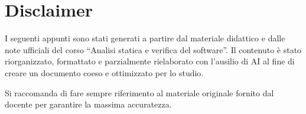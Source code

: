 \documentclass{article}
\begin{document}
\maketitle

\tableofcontents

\section*{Disclaimer}

\vfill
\begin{nota*}{}
I seguenti appunti sono stati generati a partire dal materiale
didattico e dalle note ufficiali del corso ``Analisi statica e verifica del
software''.
Il contenuto è stato riorganizzato, formattato e parzialmente rielaborato con
l'ausilio di AI al fine di creare un documento coeso e ottimizzato per lo studio.

\medskip

Si raccomanda di fare sempre riferimento al materiale originale fornito dal
docente per garantire la massima accuratezza.
\end{nota*}
\vfill














\end{document}
